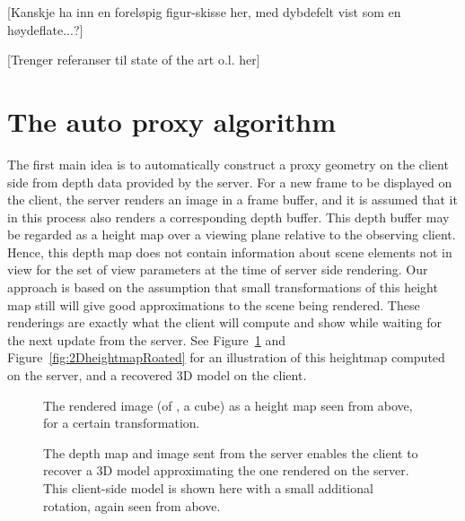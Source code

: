[Kanskje ha inn en foreløpig figur-skisse her, med dybdefelt vist som en
  høydeflate...?]

[Trenger referanser til state of the art o.l. her]


\section{The auto proxy algorithm}

The first main idea is to automatically construct a proxy geometry on the client
side from depth data provided by the server. For a new frame to be displayed on
the client, the server renders an image in a frame buffer, and it is assumed
that it in this process also renders a corresponding depth buffer. This depth
buffer may be regarded as a height map over a viewing plane relative to the
observing client. Hence, this depth map does not contain information about scene
elements not in view for the set of view parameters at the time of server side
rendering. Our approach is based on the assumption that small transformations of
this height map still will give good approximations to the scene being
rendered. These renderings are exactly what the client will compute and show
while waiting for the next update from the server. See
Figure~\ref{fig:2Dheightmap} and Figure~\ref{fig:2DheightmapRoated} for an
illustration of this heightmap computed on the server, and a recovered 3D model
on the client.

\begin{figure}[htb]
  \centering
  
  \caption{\label{fig:2Dheightmap}
           The rendered image (of \eg, a cube) as a height map seen from above,
           for a certain transformation.}
\end{figure}

\begin{figure}[htb]
  \centering
  \caption{\label{fig:2DheightmapRotated}
           The depth map and image sent from the server enables the client to
           recover a 3D model approximating the one rendered on the server. This
           client-side model is shown here with a small additional rotation, again
           seen from above.}
\end{figure}

